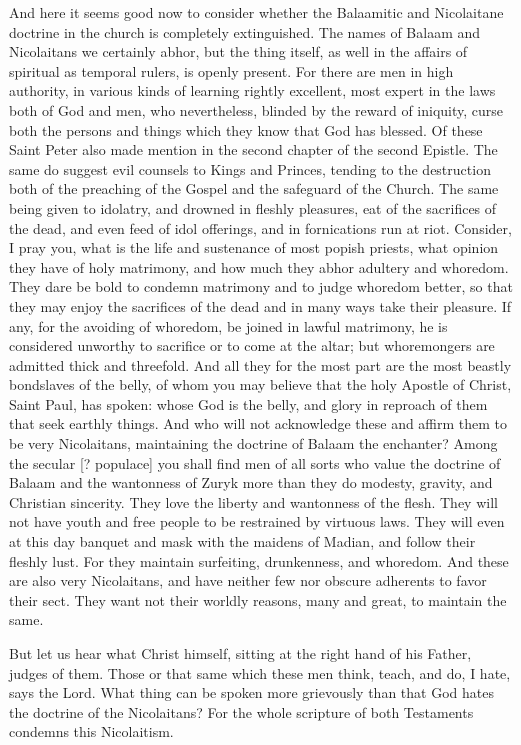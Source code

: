 And here it seems good now to consider whether the Balaamitic and Nicolaitane doctrine in the church is completely extinguished. The names of Balaam and Nicolaitans we certainly abhor, but the thing itself, as well in the affairs of spiritual as temporal rulers, is openly present. For there are men in high authority, in various kinds of learning rightly excellent, most expert in the laws both of God and men, who nevertheless, blinded by the reward of iniquity, curse both the persons and things which they know that God has blessed. Of these Saint Peter also made mention in the second chapter of the second Epistle. The same do suggest evil counsels to Kings and Princes, tending to the destruction both of the preaching of the Gospel and the safeguard of the Church. The same being given to idolatry, and drowned in fleshly pleasures, eat of the sacrifices of the dead, and even feed of idol offerings, and in fornications run at riot. Consider, I pray you, what is the life and sustenance of most popish priests, what opinion they have of holy matrimony, and how much they abhor adultery and whoredom. They dare be bold to condemn matrimony and to judge whoredom better, so that they may enjoy the sacrifices of the dead and in many ways take their pleasure. If any, for the avoiding of whoredom, be joined in lawful matrimony, he is considered unworthy to sacrifice or to come at the altar; but whoremongers are admitted thick and threefold. And all they for the most part are the most beastly bondslaves of the belly, of whom you may believe that the holy Apostle of Christ, Saint Paul, has spoken: whose God is the belly, and glory in reproach of them that seek earthly things. And who will not acknowledge these and affirm them to be very Nicolaitans, maintaining the doctrine of Balaam the enchanter? Among the secular [? populace] you shall find men of all sorts who value the doctrine of Balaam and the wantonness of Zuryk more than they do modesty, gravity, and Christian sincerity. They love the liberty and wantonness of the flesh. They will not have youth and free people to be restrained by virtuous laws. They will even at this day banquet and mask with the maidens of Madian, and follow their fleshly lust. For they maintain surfeiting, drunkenness, and whoredom. And these are also very Nicolaitans, and have neither few nor obscure adherents to favor their sect. They want not their worldly reasons, many and great, to maintain the same.

But let us hear what Christ himself, sitting at the right hand of his Father, judges of them. Those or that same which these men think, teach, and do, I hate, says the Lord. What thing can be spoken more grievously than that God hates the doctrine of the Nicolaitans? For the whole scripture of both Testaments condemns this Nicolaitism.

